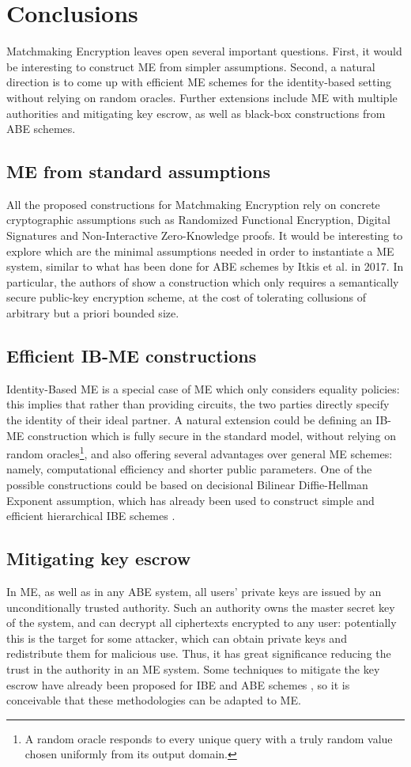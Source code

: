 \chapter{Conclusions}
Matchmaking Encryption leaves open several important questions.
First, it would be interesting to construct ME from simpler assumptions.
Second, a natural direction is to come up with efficient ME schemes for the identity-based setting without relying on random oracles.
Further extensions include ME with multiple authorities and mitigating key escrow, as well as black-box constructions from ABE schemes.

\section{ME from standard assumptions}
All the proposed constructions for Matchmaking Encryption rely on concrete cryptographic assumptions such as Randomized Functional Encryption, Digital Signatures and Non-Interactive Zero-Knowledge proofs.
It would be interesting to explore which are the minimal assumptions needed in order to instantiate a ME system, similar to what has been done for ABE schemes by Itkis et al. \cite{Itkis} in 2017.
In particular, the authors of \cite{Itkis} show a construction which only requires a semantically secure public-key encryption scheme, at the cost of tolerating collusions of arbitrary but a priori bounded size.

\section{Efficient IB-ME constructions}
Identity-Based ME is a special case of ME which only considers equality policies: this implies that rather than providing circuits, the two parties directly specify the identity of their ideal partner.
A natural extension could be defining an IB-ME construction which is fully secure in the standard model, without relying on random oracles\footnote{A random oracle responds to every unique query with a truly random value chosen uniformly from its output domain.}, and also offering several advantages over general ME schemes: namely, computational efficiency and shorter public parameters.
One of the possible constructions could be based on decisional Bilinear Diffie-Hellman Exponent assumption, which has already been used to construct simple and efficient hierarchical IBE schemes \cite{Gentry}.

\section{Mitigating key escrow}
In ME, as well as in any ABE system, all users' private keys are issued by an unconditionally trusted authority.
Such an authority owns the master secret key of the system, and can decrypt all ciphertexts encrypted to any user: potentially this is the target for some attacker, which can obtain private keys and redistribute them for malicious use.
Thus, it has great significance reducing the trust in the authority in an ME system.
Some techniques to mitigate the key escrow have already been proposed for IBE and ABE schemes \cite{Wang}, so it is conceivable that these methodologies can be adapted to ME.

